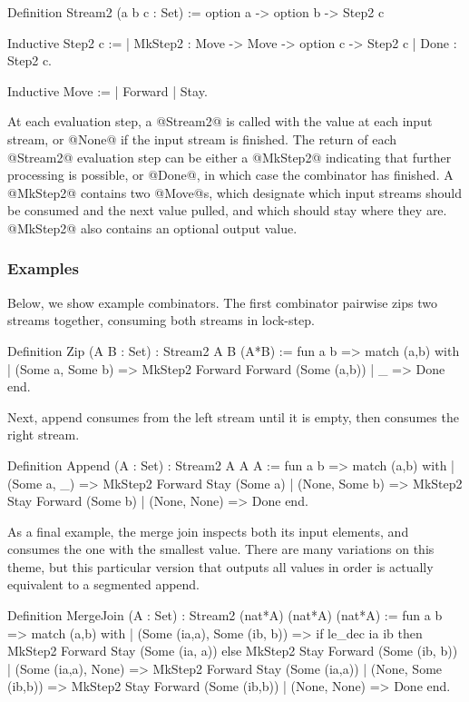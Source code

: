 \begin{code}
Definition Stream2 (a b c : Set)
 := option a -> option b -> Step2 c

Inductive Step2 c :=
 | MkStep2 : Move -> Move -> option c -> Step2 c
 | Done    : Step2 c.

Inductive Move :=
 | Forward
 | Stay.
\end{code}

At each evaluation step, a @Stream2@ is called with the value at each input stream, or @None@ if the input stream is finished.
The return of each @Stream2@ evaluation step can be either a @MkStep2@ indicating that further processing is possible, or @Done@, in which case the combinator has finished.
A @MkStep2@ contains two @Move@s, which designate which input streams should be consumed and the next value pulled, and which should stay where they are.
@MkStep2@ also contains an optional output value.

\subsubsection{Examples}

Below, we show example combinators.
The first combinator pairwise zips two streams together, consuming both streams in lock-step.

\begin{code}
Definition Zip (A B : Set)
 :  Stream2 A B (A*B)
 := fun a b =>
    match (a,b) with
    | (Some a, Some b)
    => MkStep2 Forward Forward (Some (a,b))
    | _               
    => Done
    end.
\end{code}

Next, append consumes from the left stream until it is empty, then consumes the right stream.
\begin{code}
Definition Append (A : Set)
 :  Stream2 A A A
 := fun a b =>
    match (a,b) with
    | (Some a, _)
    => MkStep2 Forward Stay    (Some a)
    | (None,   Some b)
    => MkStep2 Stay    Forward (Some b)
    | (None,   None)               
    => Done
    end.
\end{code}

As a final example, the merge join inspects both its input elements, and consumes the one with the smallest value.
There are many variations on this theme, but this particular version that outputs all values in order is actually equivalent to a segmented append.

\begin{code}
Definition MergeJoin (A : Set)
 :  Stream2 (nat*A) (nat*A) (nat*A)
 := fun a b =>
    match (a,b) with
    | (Some (ia,a), Some (ib, b))
    => if   le_dec ia ib
       then MkStep2 Forward Stay (Some (ia, a))
       else MkStep2 Stay Forward (Some (ib, b))
    | (Some (ia,a), None)
    =>      MkStep2 Forward Stay (Some (ia,a))
    | (None, Some (ib,b))
    =>      MkStep2 Stay Forward (Some (ib,b))
    | (None, None)
    =>      Done
    end.
\end{code}
